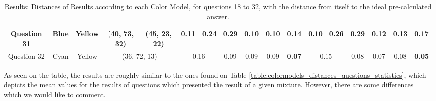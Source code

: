 \begin{table}[!htbp]
{\begin{tabular}{@{}cccccclccccclcccc@{}}
    \multicolumn{1}{c|}{Question 31} & \multicolumn{1}{c|}{Blue}    & \multicolumn{1}{c|}{Yellow}  & \multicolumn{1}{c||}{\cellcolor[HTML]{00FF80}(40, 73, 32)} & \multicolumn{1}{c||}{\cellcolor[HTML]{FF007F}(45, 23, 22)} & \multicolumn{1}{c|}{0.11}    & \multicolumn{1}{l|}{0.24}   & \multicolumn{1}{c|}{0.29}                                  & \multicolumn{1}{c|}{\cellcolor[HTML]{32CB00}\textbf{0.10}}                                  & \multicolumn{1}{c|}{\cellcolor[HTML]{32CB00}\textbf{0.10}}                                  & \multicolumn{1}{c||}{0.14}                                  & \multicolumn{1}{c|}{\cellcolor[HTML]{32CB00}\textbf{0.10}}    & \multicolumn{1}{l|}{0.26}   & \multicolumn{1}{c|}{0.29}                                  & \multicolumn{1}{c|}{0.12}                                  & \multicolumn{1}{c|}{0.13}                                  & \multicolumn{1}{c|}{0.17}                                  \\ \midrule
    \multicolumn{1}{c|}{Question 32} & \multicolumn{1}{c|}{Cyan}    & \multicolumn{1}{c|}{Yellow}  & \multicolumn{2}{c||}{\cellcolor[HTML]{00FF00}(36, 72, 13)}                                                             & \multicolumn{2}{c|}{0.16}                                  & \multicolumn{1}{c|}{0.09}                                  & \multicolumn{1}{c|}{0.09}                                  & \multicolumn{1}{c|}{0.09}                                  & \multicolumn{1}{c||}{\cellcolor[HTML]{32CB00}\textbf{0.07}} & \multicolumn{2}{c|}{0.15}                                  & \multicolumn{1}{c|}{0.08}                                  & \multicolumn{1}{c|}{0.07}                                  & \multicolumn{1}{c|}{0.08}                                  & \multicolumn{1}{c|}{\cellcolor[HTML]{32CB00}\textbf{0.05}} \\ \bottomrule
  \end{tabular}}
  \caption[Results: Distances of Results according to each Color Model, for questions 18 to 32.]{Results: Distances of Results according to each Color Model, for questions 18 to 32, with the distance from itself to the ideal pre-calculated answer.}
  \vspace{-5pt}
  \label{table:expectation_distances_labonline}
\end{table}
%
As seen on the table, the results are roughly similar to the ones found on Table \ref{table:colormodels_distances_questions_statistics}, which depicts the mean values for the results of questions which
presented the result of a given mixture. However, there are some differences which we would like to comment.
